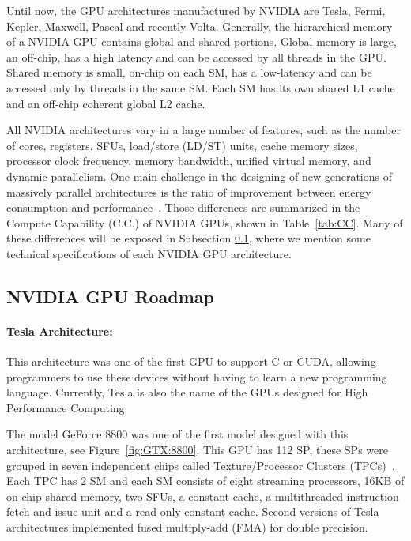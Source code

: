 Until now, the GPU architectures manufactured by NVIDIA are Tesla, Fermi, Kepler, Maxwell, Pascal and recently Volta. Generally, the hierarchical memory of a NVIDIA GPU contains global and shared portions. Global memory is large, an off-chip, has a high latency and can be accessed by all threads in the GPU. Shared memory is small, on-chip on each SM, has a low-latency and can be accessed only by threads in the same SM. Each SM has its own shared L1 cache and an off-chip coherent global L2 cache. 

All NVIDIA architectures vary in a large number of features, such as the number of cores, registers, SFUs, load/store (LD/ST) units, cache memory sizes, processor clock frequency, memory bandwidth, unified virtual memory, and dynamic parallelism. One main challenge in the designing of new generations of massively parallel architectures is the ratio of improvement between energy consumption and performance~\citep{Mittal:2014}. 
Those differences are summarized in the Compute Capability (C.C.) of NVIDIA GPUs, shown in Table~\ref{tab:CC}. Many of these differences will be exposed in Subsection \ref{ssec:GPUroadmap}, where we mention some technical specifications of each NVIDIA GPU architecture.  

\subsection{NVIDIA GPU Roadmap}\label{ssec:GPUroadmap}

\paragraph{Tesla Architecture:}
This architecture was one of the first GPU to support C or CUDA, allowing programmers to use these devices without having to learn a new programming language. 
Currently, Tesla is also the name of the GPUs designed for High Performance Computing. 

The model GeForce 8800 was one of the first model designed with this architecture, see Figure~\ref{fig:GTX:8800}. This GPU has 112 SP, these SPs were grouped in seven independent chips called Texture/Processor Clusters (TPCs)~\citep{2008:TeslaGPU}. Each TPC has 2 SM and each SM consists of eight streaming processors, 16KB of on-chip shared memory, two SFUs, a constant cache, a multithreaded instruction fetch and issue unit and a read-only constant cache. Second versions of Tesla architectures implemented fused multiply-add (FMA) for double precision.

